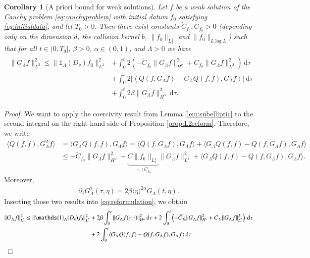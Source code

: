 \documentclass[11pt,a4paper,reqno]{amsart}
\theoremstyle{plain}
\newtheorem{corollary}[proposition]{Corollary}
\theoremstyle{definition}
\begin{document}
\begin{corollary}[A priori bound for weak solutions]  \label{cor:gronwallbound}
	Let $f$ be a weak solution of the Cauchy problem \eqref{eq:cauchyproblem} with initial datum $f_0$ satisfying \eqref{eq:initialdata}, and let $T_0>0$. Then there exist constants $\widetilde{C}_{f_0}, C_{f_0} >0$ (depending only on the dimension $d$, the collision kernel $b$, $\|f_0\|_{L^1_2}$ and $\|f_0\|_{L\log L}$) such that for all $t\in(0, T_0]$, $\beta>0$, $\alpha\in(0,1)$, and $\Lambda>0$ we have
	\begin{align}
	\begin{split}
		\|G_{\Lambda}f\|_{L^2}^2
		\leq
		  \|{\mathds{1}}_{\Lambda}(D_v)f_0\|_{L^2}^2
		  &+ \int_0^t 2\left( - \widetilde{C}_{f_0} \|G_{\Lambda}f\|_{H^{\nu}}^2 + C_{f_0} \|G_{\Lambda}f\|_{L^2}^2 \right) \, \mathrm{d}\tau \\
		&+ \int_0^t 2\left| \left\langle Q(f, G_{\Lambda}f) - G_{\Lambda} Q(f,f), G_{\Lambda}f\right\rangle\right| \, \mathrm{d}\tau \\
		&+ \int_0^t 2\beta \|G_{\Lambda}f\|_{H^{\alpha}}^2 \,\mathrm{d}\tau.
		\end{split}
	\end{align}
\end{corollary}

\begin{proof}
We want to apply the coercivity result from Lemma \ref{lem:subelliptic} to the second integral on the right hand side of Proposition \ref{prop:L2reform}. Therefore, we write
\begin{align*}
	\langle Q(f,f), G_{\Lambda}^2f \rangle &= \langle G_{\Lambda} Q(f,f), G_{\Lambda}f\rangle = \langle Q(f, G_{\Lambda}f), G_{\Lambda}f\rangle + \langle G_{\Lambda}Q(f,f) - Q(f,G_{\Lambda}f), G_{\Lambda}f\rangle \\
		&\leq - \widetilde{C}_{f_0} \|G_{\Lambda}f\|_{H^{\nu}}^2 + \underbrace{C \|f_0\|_{L^1_2}}_{=: C_{f_0}} \|G_{\Lambda}f\|_{L^2}^2 + \langle G_{\Lambda}Q(f,f) - Q(f,G_{\Lambda}f), G_{\Lambda}f\rangle .
\end{align*}
Moreover,
\begin{align*}
	\partial_\tau G_{\Lambda}^2(\tau, \eta)= 2\beta \langle \eta\rangle^{2\alpha} G_\Lambda(t,\eta) .
\end{align*}
Inserting those two results into \eqref{eq:reformulation}, we obtain
\begin{align*}
	\|G_{\Lambda} f\|_{L^2}^2 \leq \|{\mathds{1}}_{\Lambda}(D_v)f_0\|_{L^2}^2 &+ 2\beta \int_0^t \|G_{\Lambda}f(\tau, \cdot)\|_{H^{\alpha}}^2 \, \mathrm{d}\tau + 2 \int_0^t \left( -\widetilde{C}_{f_0} \|G_{\Lambda}f\|_{H^{\nu}}^2 + C_{f_0} \|G_{\Lambda}f\|_{L^2}^2 \right) \, \mathrm{d}\tau \\ &+ 2\int_0^t \langle G_{\Lambda}Q(f,f) - Q(f,G_{\Lambda}f), G_{\Lambda}f\rangle \,\mathrm{d}\tau. \qedhere
\end{align*}
\end{proof}
\end{document}

